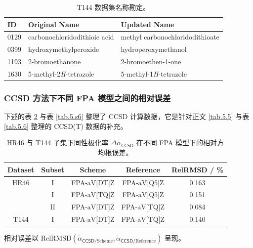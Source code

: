 \begin{table}[H]
    \centering
    \caption{T144 数据集名称勘定。}
    \label{tab.T144-name-errata}
    \begin{tabular}{lll}
    \hline
    ID   & Original   Name                & Updated   Name                    \\ \hline
    0129 & carbonochloridodithioic   acid & methyl   carbonochloridodithioate \\
    0399 & hydroxymethylperoxide          & hydroperoxymethanol               \\
    1193 & 2-bromoethanone                & 2-bromoethen-1-one                \\
    1630 & 5-methyl-2\textit{H}-tetrazole          & 5-methyl-1\textit{H}-tetrazole             \\ \hline
    \end{tabular}
\end{table}

\subsubsection{CCSD 方法下不同 FPA 模型之间的相对误差}

下述的表 \ref{tab.5.s5} 与表 \ref{tab.5.s6} 整理了 CCSD 计算数据，它是针对正文 \ref{tab.5.5} 与表 \ref{tab.5.6} 整理的 CCSD(T) 数据的补充。

\begin{table}[ht]
    \centering
    \caption{HR46 与 T144 子集下同性极化率 $\Delta \tilde \alpha_\textsf{CCSD}$ 在不同 FPA 模型下的相对方均根误差。}
    \label{tab.5.s5}
    \begin{tabular}{ccccc}
    \hline
    Dataset & Subset & Scheme & Reference & RelRMSD / \% \\ \hline
    HR46    & I      & FPA-aV[DT]Z & FPA-aV[Q5]Z & 0.163 \\
            & I      & FPA-aV[TQ]Z & FPA-aV[Q5]Z & 0.151 \\
            & II     & FPA-aV[DT]Z & FPA-aV[TQ]Z & 0.084 \\
    T144    & I      & FPA-aV[DT]Z & FPA-aV[TQ]Z & 0.140 \\ \hline
    \end{tabular}

    \raggedright
    \par{} 相对误差以 $\text{RelRMSD} (\tilde \alpha_{\textsf{CCSD}/\text{Scheme}}, \tilde \alpha_{\textsf{CCSD}/\text{Reference}})$ 呈现。
\end{table}

